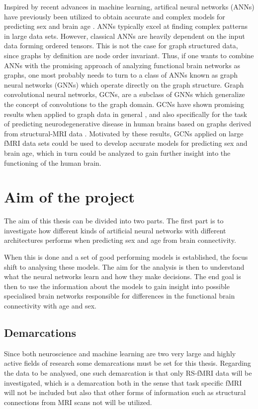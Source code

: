 Inspired by recent advances in machine learning, artifical neural networks (ANNs) have previously been utilized to obtain accurate and complex models for predicting sex and brain age \cite{multiplex}\cite{stankeviciute}\cite{arslan}. ANNs typically excel at finding complex patterns in large data sets. However, classical ANNs are heavily dependent on the input data forming ordered tensors. This is not the case for graph structured data, since graphs by definition are node order invariant. Thus, if one wants to combine ANNs with the promising approach of analyzing functional brain networks as graphs, one most probably needs to turn to a class of ANNs known as graph neural networks (GNNs)  which operate directly on the graph structure. Graph convolutional neural networks, GCNs, are a subclass of GNNs which generalize the concept of convolutions to the graph domain. GCNs have shown promising results when applied to graph data in general \cite{kipf_semi_supervised}\cite{kipf_vae}\cite{wu_review}, and also specifically for the task of predicting neurodegenerative disease in human brains based on graphs derived from structural-MRI data \cite{jansson_sandstrom}. Motivated by these results, GCNs applied on large fMRI data sets could be used to develop accurate models for predicting sex and brain age, which in turn could be analyzed to gain further insight into the functioning of the human brain.



\section{Aim of the project}
The aim of this thesis can be divided into two parts. The first part is to investigate how different kinds of artificial neural networks with different architectures performs when predicting sex and age from brain connectivity.

When this is done and a set of good performing models is established, the focus shift to analysing these models. The aim for the analysis is then to understand what the neural networks learn and how they make decisions. The end goal is then to use the information about the models to gain insight into possible specialised brain networks responsible for differences in the functional brain connectivity with age and sex.

\subsection{Demarcations}
Since both neuroscience and machine learning are two very large and highly active fields of research some demarcations must be set for this thesis. Regarding the data to be analysed, one such demarcation is that only RS-fMRI data will be investigated, which is a demarcation both in the sense that task specific fMRI will not be included but also that other forms of information such as structural connections from MRI scans not will be utilized. 

